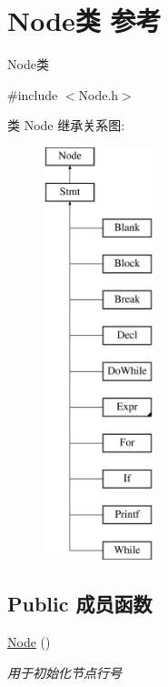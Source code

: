 \hypertarget{class_node}{}\section{Node类 参考}
\label{class_node}


Node类  




{\ttfamily \#include $<$Node.\+h$>$}

类 Node 继承关系图\+:\begin{figure}[H]
\begin{center}
\leavevmode
\includegraphics[height=12.000000cm]{class_node}
\end{center}
\end{figure}
\subsection*{Public 成员函数}
\begin{DoxyCompactItemize}
\item 
\mbox{\label{class_node_ad7a34779cad45d997bfd6d3d8043c75f}} 
\hyperlink{class_node_ad7a34779cad45d997bfd6d3d8043c75f}{Node} ()
\begin{DoxyCompactList}\small\item\em 用于初始化节点行号 \end{DoxyCompactList}\end{DoxyCompactItemize}
